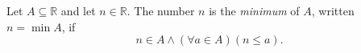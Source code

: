 \begin{definition}[Minimum]
\label{def:minimum}
Let $A\subseteq\mathbb{R}$ and let $n\in\mathbb{R}$. The number $n$ is the
\emph{minimum} of $A$, written $n=\min A$, if
\[
  n\in A
  \land
  (\forall a\in A)(n\leq a).
\]
\end{definition}